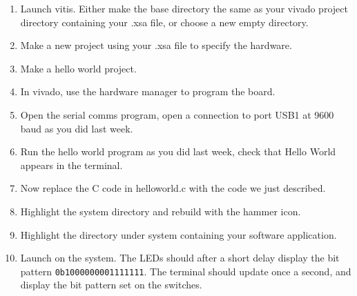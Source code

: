 \documentclass[../physical_computing.tex]{subfiles}
\begin{document}
\begin{enumerate}
    \item Launch vitis. Either make the base directory the same as your vivado project directory containing your .xsa file, or choose a new empty directory.
    \item Make a new project using your .xsa file to specify the hardware.
    \item Make a hello world project.
    \item In vivado, use the hardware manager to program the board.
    \item Open the serial comms program, open a connection to port USB1 at 9600 baud as you did last week.
    \item Run the hello world program as you did last week, check that Hello World appears in the terminal.
    \item Now replace the C code in helloworld.c with the code we just described. 
    \item Highlight the system directory and rebuild with the hammer icon.
    \item Highlight the directory under system containing your software application.
    \item Launch on the system. The LEDs should after a short delay display the bit pattern \texttt{0b1000000001111111}. The terminal should update once a second, and display the bit pattern set on the switches.
\end{enumerate}
\end{document}
